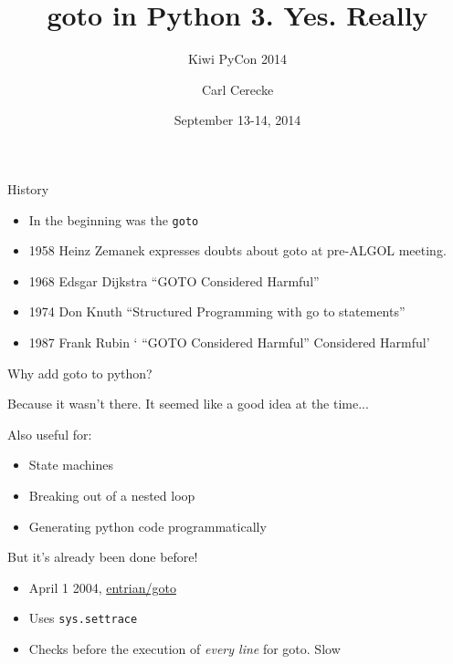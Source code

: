 \documentclass{beamer}
\title{goto in Python 3. Yes. Really}
\subtitle{Kiwi PyCon 2014}
\author{Carl Cerecke}
\date{September 13-14, 2014}
\begin{document}
    \begin{frame}[plain]
        \titlepage
    \end{frame}

\begin{frame}{History}

\begin{itemize}
\item In the beginning was the \texttt{goto}
\item 1958 Heinz Zemanek expresses doubts about goto at pre-ALGOL meeting.
\item 1968 Edsgar Dijkstra ``GOTO Considered Harmful''
\item 1974 Don Knuth ``Structured Programming with go to statements''
\item 1987 Frank Rubin ` ``GOTO Considered Harmful'' Considered Harmful'
\end{itemize}

\end{frame}

\begin{frame}{Why add goto to python?}

Because it wasn't there. It seemed like a good idea at the time...
\vspace{1cm}

Also useful for:
\begin{itemize}
\item State machines
\item Breaking out of a nested loop
\item Generating python code programmatically
\end{itemize}

\end{frame}

\begin{frame}{But it's already been done before!}

\begin{itemize}
\item April 1 2004, \href{http://entrian/goto}{entrian/goto}

\item Uses \texttt{sys.settrace}

\item Checks before the execution of \emph{every line} for goto. Slow
\end{itemize}
\end{frame}
\end{document}
